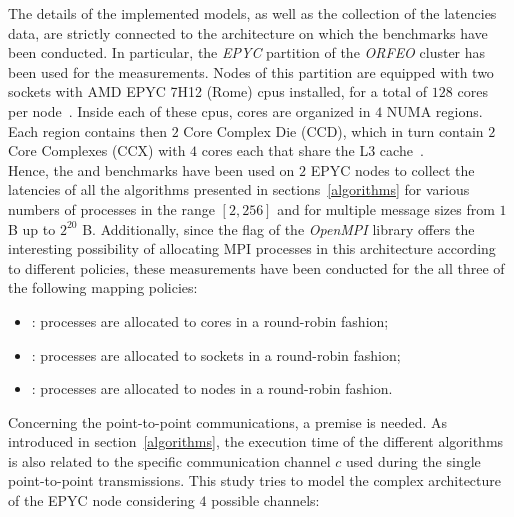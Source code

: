 \documentclass[../main.tex]{subfiles}
\begin{document}
The details of the implemented models, as well as the collection of the latencies data, are strictly connected to the architecture on which the benchmarks have been conducted. In particular, the \textit{EPYC} partition of the \textit{ORFEO} cluster has been used for the measurements. Nodes of this partition are equipped with two sockets with AMD EPYC 7H12 (Rome) cpus installed, for a total of $128$ cores per node~\cite{epyc}. Inside each of these cpus, cores are organized in $4$ NUMA regions. Each region contains then $2$ Core Complex Die (CCD), which in turn contain $2$ Core Complexes (CCX) with $4$ cores each that share the L3 cache~\cite{Velten2022}.\\
Hence, the  and  benchmarks have been used on $2$ EPYC nodes to collect the latencies of all the algorithms presented in sections~\ref{algorithms} for various numbers of processes in the range $[2,256]$ and for multiple message sizes from $1$ B up to $2^{20}$ B. Additionally, since the  flag of the \textit{OpenMPI} library offers the interesting possibility of allocating MPI processes in this architecture according to different policies, these measurements have been conducted for the all three of the following mapping policies: 
\begin{itemize}[itemsep=0pt]
    \item {}: processes are allocated to cores in a round-robin fashion;
    \item {}: processes are allocated to sockets in a round-robin fashion;
    \item {}: processes are allocated to nodes in a round-robin fashion.
\end{itemize}
Concerning the point-to-point communications, a premise is needed. As introduced in section~\ref{algorithms}, the execution time of the different algorithms is also related to the specific communication channel $c$ used during the single point-to-point transmissions. This study tries to model the complex architecture of the EPYC node considering $4$ possible channels:
\end{document}
